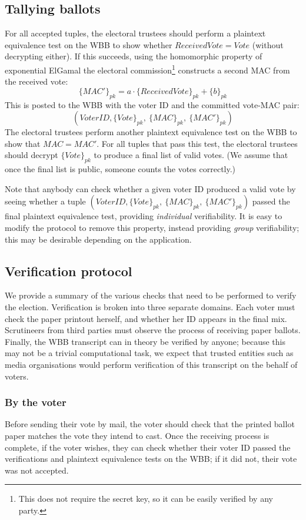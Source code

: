 \documentclass[11pt,twoside,a4paper]{article}
\theoremstyle{definition}
\newcommand{\Vote}{\mathit{Vote}}
\newcommand{\VoterID}{\mathit{VoterID}}
\newcommand{\Mac}{\mathit{MAC}}
\begin{document}
\subsection{Tallying ballots}
For all accepted tuples, the electoral trustees should perform a plaintext equivalence test on the WBB to show whether $ReceivedVote=\Vote$ (without decrypting either). If this succeeds, using the homomorphic property of exponential ElGamal the electoral commission\footnote{This does not require the secret key, so it can be easily verified by any party.} constructs a second MAC from the received vote:
$$\{\Mac'\}_{pk}=a\cdot\{ReceivedVote\}_{pk}+\{b\}_{pk}$$
This is posted to the WBB with the voter ID and the committed vote-MAC pair:
$$\left(\VoterID, \{\Vote\}_{pk},\ \{\Mac\}_{pk},\ \{\Mac'\}_{pk}\right)$$
The electoral trustees perform another plaintext equivalence test on the WBB to show that $\Mac=\Mac'$. For all tuples that pass this test, the electoral trustees should decrypt $\{\Vote\}_{pk}$ to produce a final list of valid votes. (We assume that once the final list is public, someone counts the votes correctly.)

Note that anybody can check whether a given voter ID produced a valid vote by seeing whether a tuple $\left(\VoterID, \{\Vote\}_{pk},\ \{\Mac\}_{pk},\ \{\Mac'\}_{pk}\right)$ passed the final plaintext equivalence test, providing \textit{individual} verifiability. It is easy to modify the protocol to remove this property, instead providing \textit{group} verifiability; this may be desirable depending on the application.
\subsection{Verification protocol}
We provide a summary of the various checks that need to be performed to verify the election. Verification is broken into three separate domains. Each voter must check the paper printout herself, and whether her ID appears in the final mix. Scrutineers from third parties must observe the process of receiving paper ballots. Finally, the WBB transcript can in theory be verified by anyone; because this may not be a trivial computational task, we expect that trusted entities such as media organisations would perform verification of this transcript on the behalf of voters.

\subsubsection{By the voter}
Before sending their vote by mail, the voter should check that the printed ballot paper matches the vote they intend to cast. Once the receiving process is complete, if the voter wishes, they can check whether their voter ID passed the verifications and plaintext equivalence tests on the WBB; if it did not, their vote was not accepted.
\end{document}
